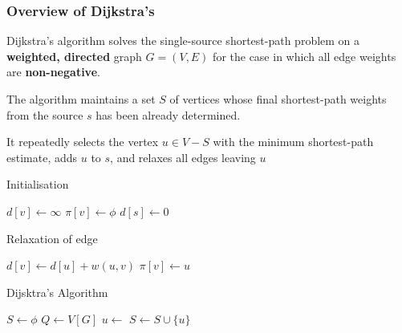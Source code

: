 \documentclass{beamer}
\begin{document}
\begin{frame}
	\frametitle{Overview of Dijkstra's}
	Dijkstra's algorithm solves the single-source shortest-path problem on a \textbf{weighted, directed} graph \( G = (V, E) \) for the case in which all edge weights are \textbf{non-negative}.\newline

	The algorithm maintains  a set \( S \) of vertices whose final shortest-path weights from the source \( s \) has been already determined. \newline

	It repeatedly selects the vertex \( u \in V - S \) with the minimum shortest-path estimate, adds \( u \) to \( s \), and relaxes all edges leaving \( u \) 
\end{frame}

\begin{frame}
\begin{algorithm}[H]
		\caption{Initialisation}
		\begin{algorithmic}[1]
			\State \( d[v] \gets \infty \) 
			\State \( \pi[v] \gets \phi \) 
			\EndFor
			\State \( d[s] \gets 0 \) 
			\EndFunction
		\end{algorithmic}
	\end{algorithm}
\end{frame}

\begin{frame}
	\begin{algorithm}[H]
		\caption{Relaxation of edge}
		\begin{algorithmic}[1]
				\State \( d[v] \gets d[u] + w(u,v) \) 
				\State \( \pi[v] \gets u \) 
			\EndIf
			\EndFunction
		\end{algorithmic}
	\end{algorithm}
\end{frame}

\begin{frame}
	\begin{algorithm}[H]
		\caption{Dijsktra's Algorithm}
		\begin{algorithmic}[1]
			\State {}
			\State \( S \gets \phi \) 	
			\State \( Q \gets V[G] \) 
				\State \( u \gets \) 
				\State \( S \gets S \cup \{u\} \) 
					\State {}
				\EndFor
			\EndWhile
			\EndFunction
		\end{algorithmic}
	\end{algorithm}
\end{frame}
\end{document}
